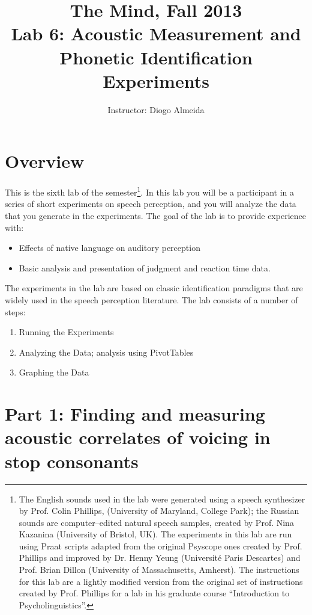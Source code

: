 \documentclass{article}
\title{The Mind, Fall 2013\\ Lab 6: Acoustic Measurement and Phonetic Identification Experiments}
\author{Instructor: Diogo Almeida}
\newcommand{\soft}[1]{\textsf{#1}}
\newcommand{\Praat}{\soft{Praat}}
\newcommand{\PsyX}{\soft{Psyscope}}
\begin{document}
\maketitle

\tableofcontents
\newpage
\listoffigures
\newpage
\section{Overview}

This is the sixth lab of the semester\footnote{The English sounds used in the lab were generated using a speech synthesizer by Prof. Colin Phillips, (University of Maryland, College Park); the Russian sounds are computer--edited natural speech samples, created by Prof. Nina Kazanina (University of Bristol, UK). The experiments in this lab are run using \Praat{} scripts adapted from the original \PsyX{} ones created by Prof. Phillips and improved by Dr. Henny Yeung (Universit\'{e} Paris Descartes) and Prof. Brian Dillon (University of Massachusetts, Amherst). The instructions for this lab are a lightly modified version from the original set of instructions created by Prof. Phillips for a lab in his graduate course ``Introduction to Psycholinguistics''.}. In this lab you will be a participant in a series of short experiments on speech perception, and you will analyze the data that you generate in the experiments. The goal of the lab is to provide experience with:

\begin{itemize}
\item Effects of native language on auditory perception
\item Basic analysis and presentation of judgment and reaction time data.
\end{itemize}

The experiments in the lab are based on classic identification paradigms that are widely used in the speech perception literature. The lab consists of a number of steps:

\begin{enumerate}
\item Running the Experiments
\item Analyzing the Data; analysis using PivotTables
\item Graphing the Data
\end{enumerate}

%
%

\section{Part 1: Finding and measuring acoustic correlates of voicing in stop consonants}
\end{document}
